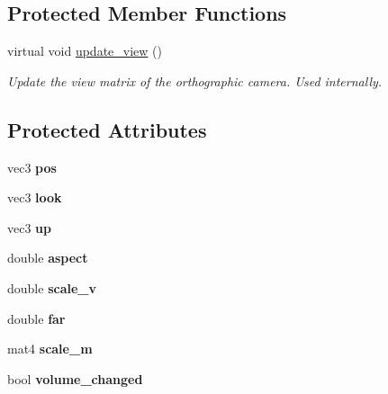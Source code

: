 \subsection*{Protected Member Functions}
\begin{DoxyCompactItemize}
\item 
\hypertarget{classgfx_1_1ortho__cam_a80f461508ab2b71d39c938beef5c57ba}{virtual void \hyperlink{classgfx_1_1ortho__cam_a80f461508ab2b71d39c938beef5c57ba}{update\-\_\-view} ()}\label{classgfx_1_1ortho__cam_a80f461508ab2b71d39c938beef5c57ba}

\begin{DoxyCompactList}\small\item\em Update the view matrix of the orthographic camera. Used internally. \end{DoxyCompactList}\end{DoxyCompactItemize}
\subsection*{Protected Attributes}
\begin{DoxyCompactItemize}
\item 
\hypertarget{classgfx_1_1ortho__cam_a754d9a39e56434721ee305e5a0f53e45}{vec3 {\bfseries pos}}\label{classgfx_1_1ortho__cam_a754d9a39e56434721ee305e5a0f53e45}

\item 
\hypertarget{classgfx_1_1ortho__cam_a4de4fd1c9e79446f1f7266d90217b2b4}{vec3 {\bfseries look}}\label{classgfx_1_1ortho__cam_a4de4fd1c9e79446f1f7266d90217b2b4}

\item 
\hypertarget{classgfx_1_1ortho__cam_a1b630086ab9e20fde6f4fd47e959f6c3}{vec3 {\bfseries up}}\label{classgfx_1_1ortho__cam_a1b630086ab9e20fde6f4fd47e959f6c3}

\item 
\hypertarget{classgfx_1_1ortho__cam_ae91d2750eb32b7e33253d7662b3b5926}{double {\bfseries aspect}}\label{classgfx_1_1ortho__cam_ae91d2750eb32b7e33253d7662b3b5926}

\item 
\hypertarget{classgfx_1_1ortho__cam_af53282509fb8f01997ef2b2c98fe9a0b}{double {\bfseries scale\-\_\-v}}\label{classgfx_1_1ortho__cam_af53282509fb8f01997ef2b2c98fe9a0b}

\item 
\hypertarget{classgfx_1_1ortho__cam_af8c46db72c1f5075f4533a8ecb728011}{double {\bfseries far}}\label{classgfx_1_1ortho__cam_af8c46db72c1f5075f4533a8ecb728011}

\item 
\hypertarget{classgfx_1_1ortho__cam_a2eb528597e124a0ac86d53664bd4eace}{mat4 {\bfseries scale\-\_\-m}}\label{classgfx_1_1ortho__cam_a2eb528597e124a0ac86d53664bd4eace}

\item 
\hypertarget{classgfx_1_1ortho__cam_a295e58950ed5407289d4961076a8b3f1}{bool {\bfseries volume\-\_\-changed}}\label{classgfx_1_1ortho__cam_a295e58950ed5407289d4961076a8b3f1}

\end{DoxyCompactItemize}


